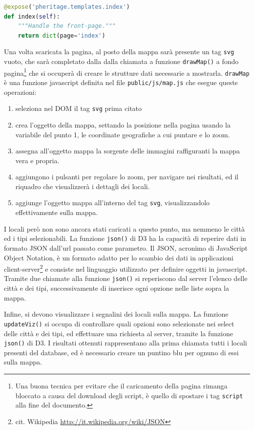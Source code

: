 \begin{lstlisting}[label=ls:index,caption={root controller, funzione index, richiamata alla richiesta della pagina web da parte del client.},language=Python]
@expose('pheritage.templates.index')
def index(self):
    """Handle the front-page."""
    return dict(page='index')
\end{lstlisting}

Una volta scaricata la pagina, al posto della mappa sarà presente un tag \texttt{svg} vuoto, che sarà completato dalla dalla chiamata a funzione \texttt{drawMap()} a fondo pagina\footnote{Una buona tecnica per evitare che il caricamento della pagina rimanga bloccato a causa del download degli script, è quello di spostare i tag \texttt{script} alla fine del documento.} che si occuperà di creare le strutture dati necessarie a mostrarla. 
\texttt{drawMap} è una funzione javascript definita nel file \texttt{public/js/map.js} che esegue queste operazioni:
\begin{enumerate}
\item seleziona nel DOM il tag \texttt{svg} prima citato
\item crea l'oggetto della mappa, settando la posizione nella pagina usando la variabile del punto 1, le coordinate geografiche a cui puntare e lo zoom.
\item assegna all'oggetto mappa la sorgente delle immagini raffiguranti la mappa vera e propria.
\item aggiungono i pulsanti per regolare lo zoom, per navigare nei risultati, ed il riquadro che visualizzerà i dettagli dei locali.
\item aggiunge l'oggetto mappa all'interno del tag \texttt{svg}, visualizzandolo effettivamente sulla mappa.
\end{enumerate}

I locali però non sono ancora stati caricati a questo punto, ma nemmeno le città ed i tipi selezionabili. La funzione \texttt{json()} di D3 ha la capacità di reperire dati in formato JSON dall'url passato come parametro. Il JSON, acronimo di JavaScript Object Notation, è un formato adatto per lo scambio dei dati in applicazioni client-server\footnote{cit. Wikipedia \url{http://it.wikipedia.org/wiki/JSON}} e consiste nel linguaggio utilizzato per definire oggetti in javascript. Tramite due chiamate alla funzione \texttt{json()} si reperiscono dal server l'elenco delle città e dei tipi, successivamente di inserisce ogni opzione nelle liste sopra la mappa.

Infine, si devono visualizzare i segnalini dei locali sulla mappa. La funzione \texttt{updateViz()} si occupa di controllare quali opzioni sono selezionate nei select delle città e dei tipi, ed effettuare una richiesta al server, tramite la funzione \texttt{json()} di D3. I risultati ottenuti rappresentano alla prima chiamata tutti i locali presenti del database, ed è necessario creare un puntino blu per ognuno di essi sulla mappa.

